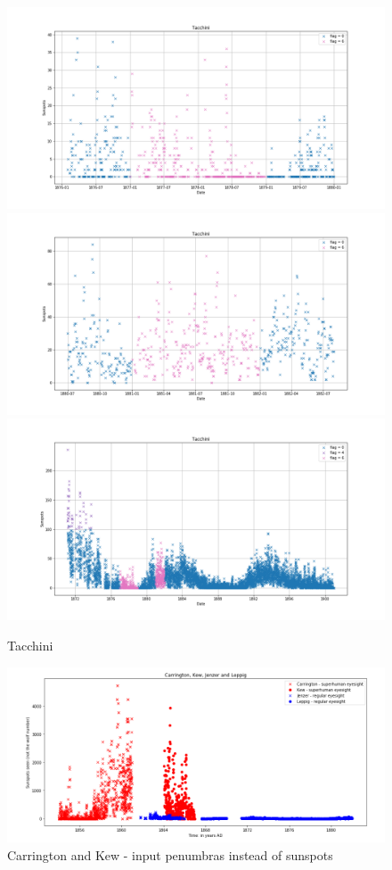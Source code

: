 \documentclass[12pt]{article}
\begin{document}
\begin{figure}[H]
    \includegraphics[width=0.5\linewidth]{tacchini1877_patch.png}
    \includegraphics[width=0.5\linewidth]{tacchini1881_patch.png}
    \includegraphics[width=\linewidth]{tacchini_pached.png}
    \caption{Tacchini}
    \label{fig:tacchini}
\end{figure}

\begin{figure}[H]
  \includegraphics[width=\linewidth]{CarringtonHasGoodEyesight.png}
  \caption{Carrington and Kew - input penumbras instead of sunspots}
  \label{fig:carrington-kew-penumbras}
\end{figure}
\end{document}
